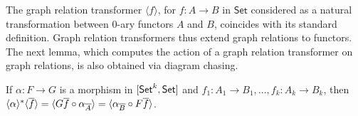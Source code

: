 \documentclass[runningheads]{llncs}
\newcommand{\set}{\mathsf{Set}}
\renewcommand{\id}{\mathit{id}}
\renewcommand{\id}{\mathit{id}}
\begin{document}
\begin{comment}
We also note that if $f : A \to B$ is a function seen as a natural
transformation between 0-ary functors, then $\graph{f}$ is (the 0-ary
relation transformer associated with) the graph relation of $f$.
Indeed, we need to apply Definition~\ref{definition:graph-nat-transf} with $k
= 0$, i.e., to the degenerate relation $\ast : \rel(\ast, \ast)$.  As
degenerate $0$-ary functors, $A$ and $B$ are constant functors, i.e.,
$A\, \ast = A$ and $B\, \ast = B$.  By the universal property of the
product, there exists a unique $h$ making the diagram
\[ \begin{tikzcd}[row sep = large]
        A
        &A
        \ar[l, equal]
        \ar[r, equal]
        \ar[d, dashed, "{h}"]
        &A
        \ar[r, "{f}"]
        &B \\
        &A \times B
        \ar[ul, "{\pi_1}"] \ar[urr, "{\pi_2}"']
\end{tikzcd}\]
commute. Since $\iota_\ast : \ast \to \ast$ is the identity on $\ast$,
and $A\, \id_{\ast} = \id_{A}$, we have $h_{\ast} = h$.  Moreover,
$h_{\overline{A \times B}} = \langle \id_{A}, f \rangle$ is a
monomorphism in $\set$ because $\id_{A}$ is.  Then,
$\iota_{f^\wedge\ast} = \langle \id_{A}, f \rangle$ and $f^\wedge\ast
= A$, from which we deduce that $\iota_{f^\wedge\ast} f^\wedge\ast =
\langle \id_{A}, f \rangle\, A = \graph{f}^*$. This ensures that the
graph of $f$ as a 0-ary natural transformation coincides with the
graph of $f$ as a morphism in $\set$, and so that
Definition~\ref{dfn:graph-nat-transf} is a reasonable generalization
of Definition~\ref{def:graph}.

Just as the equality relation $\Eq_B$ on a set $B$ coincides with
$\graph{\id_B}$, the graph of the identity on the set, so we can
define the equality relation transformer to be the graph of the
identity natural transformation. This gives

\begin{definition}
Let $F : [\set^k, \set]$.  The equality relation transformer on $F$ is
defined to be $\Eq_F = \graph{\id_{F}}$. This entails that $Eq_F = (F,
F, \Eq_F^*)$ with $\Eq_F^* = \graph{\id_{F}}^*$.
\end{definition}
\end{comment}

\noindent
The graph relation transformer $\langle f \rangle$, for $f : A \to B$
in $\set$ considered as a natural transformation between $0$-ary
functors $A$ and $B$, coincides with its standard definition. Graph
relation transformers thus extend graph relations to functors.  The
next lemma, which computes the action of a graph relation transformer
on graph relations, is also obtained via diagram chasing.
\begin{lemma}\label{lem:eq-reln-equalities}
If $\alpha : F \to G$ is a morphism in $[\mathsf{Set}^k, \mathsf{Set}]$
and $f_1: A_1 \to B_1, ..., f_k : A_k \to B_k$,
then $\langle {\alpha} \rangle^* \langle {\overline{f}} \rangle
= \langle G \overline{f} \circ \alpha_{\overline{A}} \rangle
= \langle \alpha_{\overline{B}} \circ F \overline{f} \rangle$.
\end{lemma}
\end{document}
